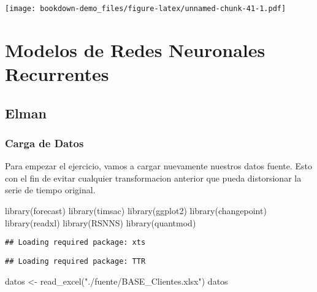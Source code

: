 \documentclass[
]{book}
\newenvironment{Shaded}{\begin{snugshade}}{\end{snugshade}}
\newcommand{\FunctionTok}[1]{\textcolor[rgb]{0.00,0.00,0.00}{#1}}
\newcommand{\NormalTok}[1]{#1}
\newcommand{\OtherTok}[1]{\textcolor[rgb]{0.56,0.35,0.01}{#1}}
\newcommand{\StringTok}[1]{\textcolor[rgb]{0.31,0.60,0.02}{#1}}
\begin{document}
\texttt{[image: bookdown-demo\_files/figure-latex/unnamed-chunk-41-1.pdf]}

\hypertarget{modelos-de-redes-neuronales-recurrentes}{%
\chapter{Modelos de Redes Neuronales Recurrentes}\label{modelos-de-redes-neuronales-recurrentes}}

\hypertarget{elman}{%
\section{Elman}\label{elman}}

\hypertarget{carga-de-datos}{%
\subsection{Carga de Datos}\label{carga-de-datos}}

Para empezar el ejercicio, vamos a cargar nuevamente nuestros datos fuente. Esto con el fin de evitar cualquier transformacion anterior que pueda distorsionar la serie de tiempo original.

\begin{Shaded}
\begin{Highlighting}[]
\FunctionTok{library}\NormalTok{(forecast)}
\FunctionTok{library}\NormalTok{(timsac)}
\FunctionTok{library}\NormalTok{(ggplot2)}
\FunctionTok{library}\NormalTok{(changepoint)}
\FunctionTok{library}\NormalTok{(readxl)}
\FunctionTok{library}\NormalTok{(RSNNS)}
\FunctionTok{library}\NormalTok{(quantmod)}
\end{Highlighting}
\end{Shaded}

\begin{verbatim}
## Loading required package: xts
\end{verbatim}

\begin{verbatim}
## Loading required package: TTR
\end{verbatim}

\begin{Shaded}
\begin{Highlighting}[]
\NormalTok{datos }\OtherTok{\textless{}{-}} \FunctionTok{read\_excel}\NormalTok{(}\StringTok{"./fuente/BASE\_Clientes.xlsx"}\NormalTok{)}
\NormalTok{datos}
\end{Highlighting}
\end{Shaded}
\end{document}
